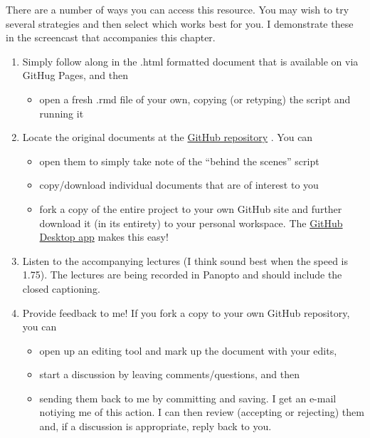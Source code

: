 \documentclass[
  english,
]{book}
\providecommand{\tightlist}{%
  \setlength{\itemsep}{0pt}\setlength{\parskip}{0pt}}
\begin{document}
There are a number of ways you can access this resource. You may wish to try several strategies and then select which works best for you. I demonstrate these in the screencast that accompanies this chapter.

\begin{enumerate}
\def\labelenumi{\arabic{enumi}.}
\tightlist
\item
  Simply follow along in the .html formatted document that is available on via GitHug Pages, and then

  \begin{itemize}
  \tightlist
  \item
    open a fresh .rmd file of your own, copying (or retyping) the script and running it
  \end{itemize}
\item
  Locate the original documents at the \href{https://github.com/lhbikos/ReC_Psychometrics}{GitHub repository} . You can

  \begin{itemize}
  \tightlist
  \item
    open them to simply take note of the ``behind the scenes'' script
  \item
    copy/download individual documents that are of interest to you
  \item
    fork a copy of the entire project to your own GitHub site and further download it (in its entirety) to your personal workspace. The \href{https://desktop.github.com/}{GitHub Desktop app} makes this easy!
  \end{itemize}
\item
  Listen to the accompanying lectures (I think sound best when the speed is 1.75). The lectures are being recorded in Panopto and should include the closed captioning.
\item
  Provide feedback to me! If you fork a copy to your own GitHub repository, you can

  \begin{itemize}
  \tightlist
  \item
    open up an editing tool and mark up the document with your edits,
  \item
    start a discussion by leaving comments/questions, and then
  \item
    sending them back to me by committing and saving. I get an e-mail notiying me of this action. I can then review (accepting or rejecting) them and, if a discussion is appropriate, reply back to you.
  \end{itemize}
\end{enumerate}
\end{document}
